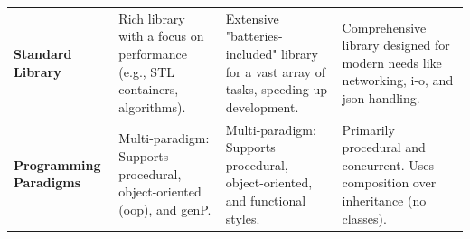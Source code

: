 \begin{table}
\begin{tabularx}{\textwidth}{
		>{\raggedright\arraybackslash}p{}
		>{\raggedright\arraybackslash}X
		>{\raggedright\arraybackslash}X
		>{\raggedright\arraybackslash}X
	}
		\textbf{Standard Library} &
		Rich library with a focus on performance (e.g., STL containers, algorithms). &
		Extensive "batteries-included" library for a vast array of tasks, speeding up development. &
		Comprehensive library designed for modern needs like networking, \gls{i-o}, and \gls{json} handling. \\
		\addlinespace
		
		\textbf{Programming Paradigms} &
		Multi-paradigm: Supports procedural, object-oriented (\gls{oop}), and \gls{genP}. &
		Multi-paradigm: Supports procedural, object-oriented, and functional styles. &
		Primarily procedural and concurrent. Uses composition over inheritance (no classes). \\
		\bottomrule
	\end{tabularx}
\end{table}



